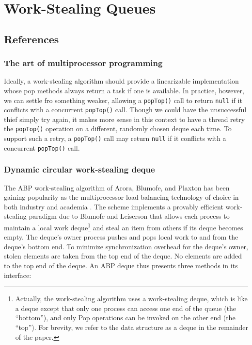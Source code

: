
\chapter{Work-Stealing Queues}
\label{chap:queues-description}

\section{References}

\subsection{The art of multiprocessor programming \cite{Herlihy2008}}

Ideally, a work-stealing algorithm should provide a linearizable
implementation whose pop methods always return a task if one is
available. In practice, however, we can settle fro something weaker,
allowing a \lstinline!popTop()! call to return \lstinline!null! if it
conflicts with a concurrent \lstinline!popTop()! call. Though we could
have the unsuccessful thief simply try again, it makes more sense in
this context to have a thread retry the \lstinline!popTop()! operation
on a different, randomly chosen deque each time. To support such a
retry, a \lstinline!popTop()! call may return \lstinline!null! if it
conflicts with a concurrent \lstinline!popTop()! call.


\subsection{Dynamic circular work-stealing deque \cite{Chase2005}}

The ABP work-stealing algorithm of Arora, Blumofe, and Plaxton
\cite{Arora2001} has been gaining popularity as the multiprocessor
load-balancing technology of choice in both industry and academia
\cite{Arora2001, Acar2002, Blumofe1995, Frigo1998, Danaher2005}. The
scheme implements a provably efficient work-stealing paradigm due to
Blumofe and Leiserson \cite{Blumofe1999} that allows each process to
maintain a local work deque\footnote{Actually, the work-stealing
  algorithm uses a work-stealing deque, which is like a deque
  \cite{Knuth1997} except that only one process can access one end of
  the queue (the ``bottom''), and only Pop operations can be invoked
  on the other end (the ``top'').  For brevity, we refer to the data
  structure as a deque in the remainder of the paper.} and steal an
item from others if its deque becomes empty.  The deque’s owner
process pushes and pops local work to and from the deque's bottom
end. To minimize synchronization overhead for the deque's owner,
stolen elements are taken from the top end of the deque. No elements
are added to the top end of the deque. An ABP deque thus presents
three methods in its interface:

